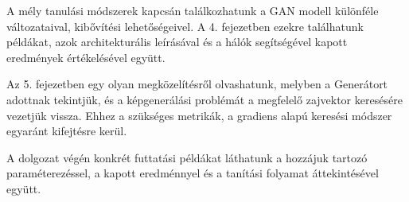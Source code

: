 A mély tanulási módszerek kapcsán találkozhatunk a GAN modell különféle változataival, kibővítési lehetőségeivel. A 4. fejezetben ezekre találhatunk példákat, azok architekturális leírásával és a hálók segítségével kapott eredmények értékelésével együtt.

Az 5. fejezetben egy olyan megközelítésről olvashatunk, melyben a Generátort adottnak tekintjük, és a képgenerálási problémát a megfelelő zajvektor keresésére vezetjük vissza. Ehhez a szükséges metrikák, a gradiens alapú keresési módszer egyaránt kifejtésre kerül.

A dolgozat végén konkrét futtatási példákat láthatunk a hozzájuk tartozó paraméterezéssel, a kapott eredménnyel és a tanítási folyamat áttekintésével együtt.
